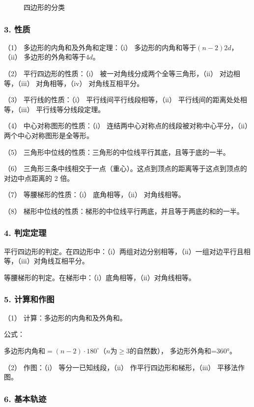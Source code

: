 \begin{figure}
\caption{四边形的分类}
\end{figure}

\subsubsection{3. 性质}

（1） 多边形的内角和及外角和定理：（i）
多边形的内角和等于\((n - 2)2d\)，（ii） 多边形的外角和等于\(4d\)。

（2） 平行四边形的性质：（i） 被一对角线分成两个全等三角形，（ii）
对边相等，（iii） 对角相等，（iv） 对角线互相平分。

（3） 平行线的性质：（i） 平行线间平行线段相等，（ii）
平行线间的距离处处相等，（iii） 平行线等分线段定理。

（4） 中心对称图形的性质：（i）
连结两中心对称点的线段被对称中心平分，（ii） 两个中心对称图形是全等形。

（5） 三角形中位线的性质：三角形的中位线平行其底，且等于底的一半。

（6）
三角形三条中线相交于一点（重心）。这点到顶点的距离等于这点到顶点的对边中点距离的
2 倍。

（7） 等腰梯形的性质：（i） 底角相等，（ii） 对角线相等。

（8） 梯形中位线的性质：梯形的中位线平行两底，并且等于两底的和的一半。

\subsubsection{4. 判定定理}

平行四边形的判定。在四边形中：（i）两组对边分别相等，（ii）一组对边平行且相等，（iii）对角线互相平分。

等腰梯形的判定。在梯形中：（i）底角相等，（ii）对角线相等。

\subsubsection{5. 计算和作图}

（1） 计算：多边形的内角和及外角和。

公式：

多边形内角和\(= (n - 2)\cdot 180^{\circ}\)（\(n\)为\(\geqslant 3\)的自然数），
多边形外角和=360°。

（2） 作图：（i） 等分一已知线段，（ii） 作平行四边形和梯形，（iii）
平移法作图。

\subsubsection{6. 基本轨迹}

